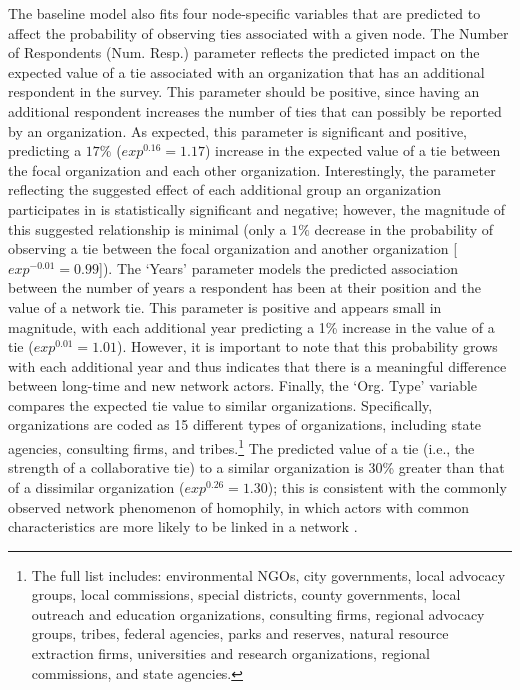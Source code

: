 \documentclass[12pt,a4paper,titlepage]{article}
\begin{document}
The baseline model also fits four node-specific variables that are predicted to affect the probability of observing ties associated with a given node. The Number of Respondents (Num. Resp.) parameter reflects the predicted impact on the expected value of a tie associated with an organization that has an additional respondent in the survey. This parameter should be positive, since having an additional respondent increases the number of ties that can possibly be reported by an organization. As expected, this parameter is significant and positive, predicting a $17\%$ ($exp^{0.16} = 1.17$) increase in the expected value of a tie between the focal organization and each other organization. Interestingly, the parameter reflecting the suggested effect of each additional group an organization participates in is statistically significant and negative; however, the magnitude of this suggested relationship is minimal (only a $1\%$ decrease in the probability of observing a tie between the focal organization and another organization [$exp^{-0.01} = 0.99$]). The `Years' parameter models the predicted association between the number of years a respondent has been at their position and the value of a network tie. This parameter is positive and appears small in magnitude, with each additional year predicting a 1\% increase in the value of a tie ($exp^{0.01} = 1.01$). However, it is important to note that this probability grows with each additional year and thus indicates that there is a meaningful difference between long-time and new network actors. Finally, the `Org. Type' variable compares the expected tie value to similar organizations. Specifically, organizations are coded as 15 different types of organizations, including state agencies, consulting firms, and tribes.\footnote{The full list includes: environmental NGOs, city governments, local advocacy groups, local commissions, special districts, county governments, local outreach and education organizations, consulting firms, regional advocacy groups, tribes, federal agencies, parks and reserves, natural resource extraction firms, universities and research organizations, regional commissions, and state agencies.} The predicted value of a tie (i.e., the strength of a collaborative tie) to a similar organization is 30\% greater than that of a dissimilar organization ($exp^{0.26} = 1.30$); this is consistent with the commonly observed network phenomenon of homophily, in which actors with common characteristics are more likely to be linked in a network \parencite{prell2012,kolaczyk2009}.
\end{document}
